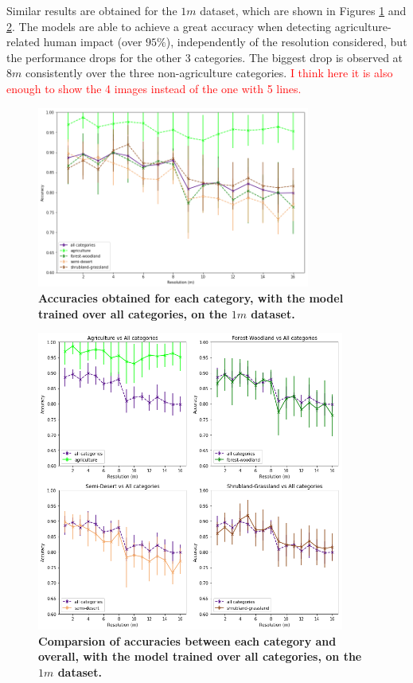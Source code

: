 Similar results are obtained for the $1m$ dataset, which are shown in Figures \ref{fig:acc_all_cat_1m} and \ref{fig:acc_by_cat_1m}. The models are able to achieve a great accuracy when detecting agriculture-related human impact (over $95\%$), independently of the resolution considered, but the performance drops for the other 3 categories. The biggest drop is observed at $8m$ consistently over the three non-agriculture categories. \textcolor{red}{I think here it is also enough to show the 4 images instead of the one with 5 lines.}

\begin{figure}[H]
	\centering
	\includegraphics[width=0.8\textwidth]{Figures/results/acc_res_all_categories_1m.png}
	\captionsetup{width=1\linewidth}
	\caption{\textbf{Accuracies obtained for each category, with the model trained over all categories, on the $1m$ dataset.}}
	\label{fig:acc_all_cat_1m}
\end{figure}

\begin{figure}[H]
	\centering
	\includegraphics[width=0.9\textwidth]{Figures/results/acc_res_by_category_1m.png}
	\captionsetup{width=1\linewidth}
	\caption{\textbf{Comparsion of accuracies between each category and overall, with the model trained over all categories, on the $1m$ dataset.}}
	\label{fig:acc_by_cat_1m}
\end{figure}


